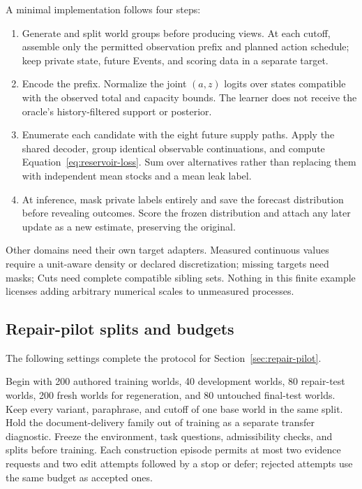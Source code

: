 \documentclass[10pt]{article}
\begin{document}
A minimal implementation follows four steps:
\begin{enumerate}
 \item Generate and split world groups before producing views. At each cutoff,
   assemble only the permitted observation prefix and planned action schedule;
   keep private state, future Events, and scoring data in a separate target.
 \item Encode the prefix. Normalize the joint $(a,z)$ logits over states
   compatible with the observed total and capacity bounds. The learner does
   not receive the oracle's history-filtered support or posterior.
 \item Enumerate each candidate with the eight future supply paths. Apply
   the shared decoder, group identical observable continuations, and compute
   Equation~\ref{eq:reservoir-loss}. Sum over alternatives rather than replacing
   them with independent mean stocks and a mean leak label.
 \item At inference, mask private labels entirely and save the forecast
   distribution before revealing outcomes. Score the frozen distribution and
   attach any later update as a new estimate, preserving the original.
\end{enumerate}
Other domains need their own target adapters. Measured continuous values
require a unit-aware density or declared discretization; missing targets need
masks; Cuts need complete compatible sibling sets. Nothing in this finite
example licenses adding arbitrary numerical scales to unmeasured processes.

\subsection{Repair-pilot splits and budgets}
\label{app:repair-protocol}

The following settings complete the protocol for
Section~\ref{sec:repair-pilot}.

Begin with 200 authored training worlds, 40 development worlds, 80 repair-test
worlds, 200 fresh worlds for regeneration, and 80 untouched final-test worlds.
Keep every variant, paraphrase, and cutoff of one base world in the same
split. Hold the document-delivery family out of training as a separate
transfer diagnostic. Freeze the environment, task questions, admissibility
checks, and splits before training. Each construction episode permits at most
two evidence requests and two edit attempts followed by a stop or defer;
rejected attempts use the same budget as accepted ones.
\end{document}
